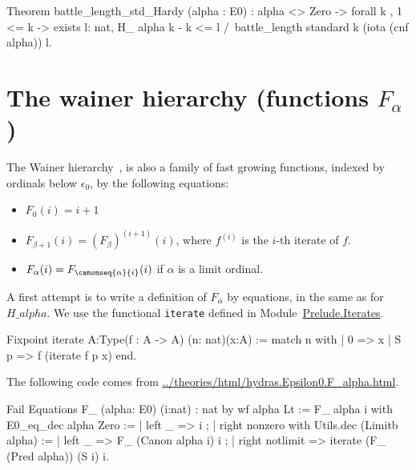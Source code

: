 \begin{Coqsrc}
Theorem battle_length_std_Hardy (alpha : E0) :
  alpha <> Zero ->
  forall k , 1 <= k -> exists l: nat,  
       H_ alpha k - k <= l /\
       battle_length standard k (iota (cnf alpha)) l.    
\end{Coqsrc}



\section{The wainer hierarchy (functions \texorpdfstring{$F_\alpha$}{F\_alpha})}
\label{sect:wainer}


The Wainer hierarchy~\cite{BW85, Wainer1970, KS81}, is also a family of fast growing functions, indexed by ordinals below $\epsilon_0$, by the following equations:

\label{F_equations}
\begin{itemize}
\item $F_0(i)=i+1$
\item $F_{\beta+1}(i)= (F_\beta)^{(i+1)}(i)$, where $f^{(i)}$ is the $i$-th iterate of $f$.
\item $F_\alpha(i) = F_{\canonseq{\alpha}{i}} (i)$ if $\alpha$ is a limit ordinal.
\end{itemize}

A first attempt is to write a definition of $F_\alpha$ by equations, in the same as for $H\_alpha$.  We use the functional \texttt{iterate} defined in 
Module~\href{../theories/html/hydras.Prelude.Iterates.html\#iterate}{Prelude.Iterates}.

\begin{Coqsrc}
Fixpoint iterate {A:Type}(f : A -> A) (n: nat)(x:A) :=
  match n with
  | 0 => x
  | S p => f (iterate  f p x)
  end.
\end{Coqsrc}

The following code comes from 
 \url{../theories/html/hydras.Epsilon0.F_alpha.html}.



\begin{Coqsrc}
Fail Equations F_ (alpha: E0) (i:nat) :  nat  by wf  alpha Lt :=
  F_ alpha  i with E0_eq_dec alpha Zero :=
    { | left _ =>  i ;
      | right nonzero
          with Utils.dec (Limitb alpha) :=
          { | left _ =>  F_ (Canon alpha i)  i ;
            | right notlimit =>  iterate (F_ (Pred alpha))  (S i) i}}.
\end{Coqsrc}


